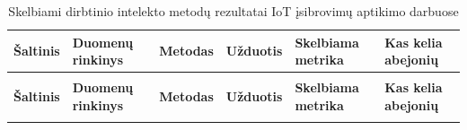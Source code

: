 \begingroup
\footnotesize
\setlength{\tabcolsep}{3pt}
\sloppy
\begin{xltabular}{\textwidth}{@{}
  >{\raggedright\arraybackslash}p{2.0cm}
  >{\raggedright\arraybackslash}p{2.0cm}
  >{\raggedright\arraybackslash}p{2.1cm}
  >{\raggedright\arraybackslash}p{1.9cm}
  >{\raggedright\arraybackslash}p{2.6cm}
  >{\raggedright\arraybackslash}X@{}}
\caption{Skelbiami dirbtinio intelekto metodų rezultatai IoT įsibrovimų
         aptikimo darbuose}
\label{tab:susije} \\
\toprule
\textbf{Šaltinis} & \textbf{Duomenų rinkinys} & \textbf{Metodas}
  & \textbf{Užduotis} & \textbf{Skelbiama metrika}
  & \textbf{Kas kelia abejonių} \\
\midrule
\endfirsthead
{} \\
\toprule
\textbf{Šaltinis} & \textbf{Duomenų rinkinys} & \textbf{Metodas}
  & \textbf{Užduotis} & \textbf{Skelbiama metrika}
  & \textbf{Kas kelia abejonių} \\
\midrule
\endhead
\bottomrule
\endlastfoot


\end{xltabular}
